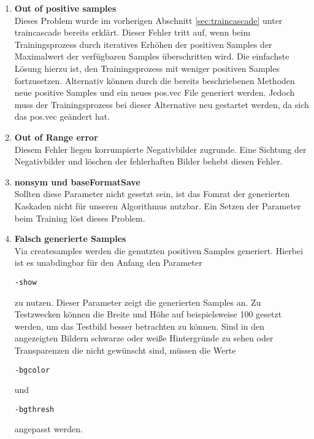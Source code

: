 \begin{enumerate}
\item \textbf{Out of positive samples}\\ Dieses Problem wurde im vorherigen Abschnitt \ref{sec:traincascade} unter traincascade bereits erklärt. Dieser Fehler tritt auf, wenn beim Trainingsprozess durch iteratives Erhöhen der positiven Samples der Maximalwert der verfügbaren Samples überschritten wird. Die einfachste Lösung hierzu ist, den Trainingsprozess mit weniger positiven Samples fortzusetzen. Alternativ können durch die bereits beschriebenen Methoden neue positive Samples und ein neues pos.vec File generiert werden. Jedoch muss der Trainingsprozess bei dieser Alternative neu gestartet werden, da sich das pos.vec geändert hat.
\item \textbf{Out of Range error}\\ Diesem Fehler liegen korrumpierte Negativbilder zugrunde. Eine Sichtung der Negativbilder und löschen der fehlerhaften Bilder behebt diesen Fehler.
\item \textbf{nonsym und baseFormatSave}\\ Sollten diese Parameter nicht gesetzt sein, ist das Fomrat der generierten Kaskaden nicht für unseren Algorithmus nutzbar. Ein Setzen der Parameter beim Training löst dieses Problem.
\item \textbf{Falsch generierte Samples}\\ Via createsamples werden die genutzten positiven Samples generiert. Hierbei ist es unabdingbar für den Anfang den Parameter 
\begin{lstlisting}
-show
\end{lstlisting}
zu nutzen. Dieser Parameter zeigt die generierten Samples an. Zu Testzwecken können die Breite und Höhe auf beispielsweise 100 gesetzt werden, um das Testbild besser betrachten zu können. Sind in den angezeigten Bildern schwarze oder weiße Hintergründe zu sehen oder Transparenzen die nicht gewünscht sind, müssen die Werte 
\begin{lstlisting}
-bgcolor
\end{lstlisting}
und
\begin{lstlisting}
-bgthresh
\end{lstlisting} angepasst werden.
\end{enumerate}